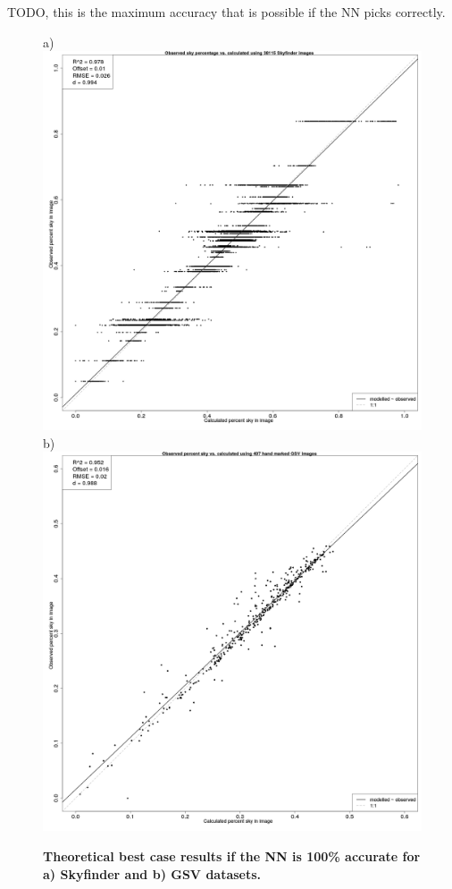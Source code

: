 \documentclass[final,3p,times,authoryear]{elsarticle}
\begin{document}
TODO, this is the maximum accuracy that is possible if the NN picks correctly.
\begin{figure}
\centering
a)\includegraphics[scale=0.12]{Images/ErrorPlots.png}
b)\includegraphics[scale=0.12]{Images/ErrorPlots2.png}
\caption{\textbf{Theoretical best case results if the NN is 100\% accurate for a) Skyfinder and b) GSV datasets.}}
\label{fig:errorplots}
\end{figure}
\end{document}
